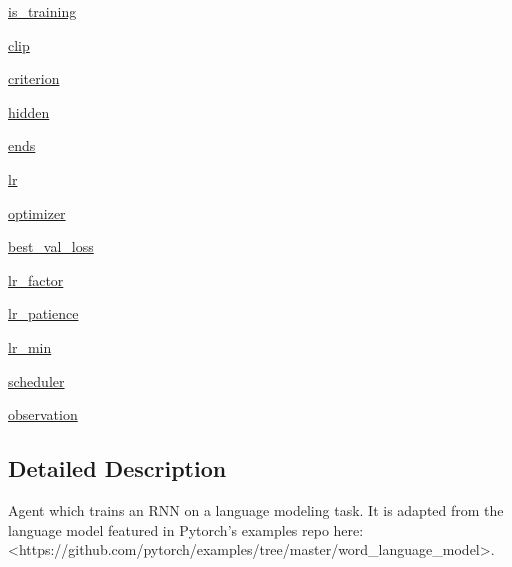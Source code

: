 \begin{DoxyCompactItemize}
\item 
\hyperlink{classparlai_1_1agents_1_1language__model_1_1language__model_1_1LanguageModelAgent_ae4a04c916f52bdd6d5163d36d49aa378}{is\+\_\+training}
\item 
\hyperlink{classparlai_1_1agents_1_1language__model_1_1language__model_1_1LanguageModelAgent_a0cedb5672a7f4f6533490fbf550cb853}{clip}
\item 
\hyperlink{classparlai_1_1agents_1_1language__model_1_1language__model_1_1LanguageModelAgent_a5a7f43878aa096fd1f091dd403dfe30c}{criterion}
\item 
\hyperlink{classparlai_1_1agents_1_1language__model_1_1language__model_1_1LanguageModelAgent_aa7c4053a69871ded8ac7f6afc31b9af3}{hidden}
\item 
\hyperlink{classparlai_1_1agents_1_1language__model_1_1language__model_1_1LanguageModelAgent_ab0db3334e63765ac0e7fd991db214f72}{ends}
\item 
\hyperlink{classparlai_1_1agents_1_1language__model_1_1language__model_1_1LanguageModelAgent_a8be32c6f1a5b35f4c508c9dc1ca911b8}{lr}
\item 
\hyperlink{classparlai_1_1agents_1_1language__model_1_1language__model_1_1LanguageModelAgent_a222e071975fc874e82e6480c030bbb9d}{optimizer}
\item 
\hyperlink{classparlai_1_1agents_1_1language__model_1_1language__model_1_1LanguageModelAgent_a981e3901460fa1eda1d8564a1792eef3}{best\+\_\+val\+\_\+loss}
\item 
\hyperlink{classparlai_1_1agents_1_1language__model_1_1language__model_1_1LanguageModelAgent_ac57a5e5b664eca0b561973b98a6f5ab5}{lr\+\_\+factor}
\item 
\hyperlink{classparlai_1_1agents_1_1language__model_1_1language__model_1_1LanguageModelAgent_a89bb8ba94b9f71ea1571b2b9b38f180a}{lr\+\_\+patience}
\item 
\hyperlink{classparlai_1_1agents_1_1language__model_1_1language__model_1_1LanguageModelAgent_a045ef7c347b9295879ff3aaec1a8d9a0}{lr\+\_\+min}
\item 
\hyperlink{classparlai_1_1agents_1_1language__model_1_1language__model_1_1LanguageModelAgent_a4695c070d27825b7ee206eac0fb4b576}{scheduler}
\item 
\hyperlink{classparlai_1_1agents_1_1language__model_1_1language__model_1_1LanguageModelAgent_aee73b46f6a1dd58cf369bf39b6c66903}{observation}
\end{DoxyCompactItemize}


\subsection{Detailed Description}
\begin{DoxyVerb}Agent which trains an RNN on a language modeling task.
It is adapted from the language model featured in Pytorch's examples repo
here: <https://github.com/pytorch/examples/tree/master/word_language_model>.
\end{DoxyVerb}
 

